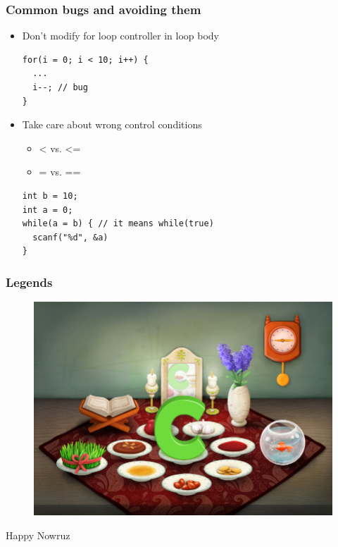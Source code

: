 \documentclass{../c-lecture}
\begin{document}
\begin{frame}[fragile]
  \frametitle{Common bugs and avoiding them}
  \begin{itemize}
    \item {\color{RubineRed} Don’t modify} for loop controller in loop body
    \begin{verbatim}
for(i = 0; i < 10; i++) {
  ...
  i--; // bug
}
    \end{verbatim}
    \item Take care about wrong control conditions
    \begin{itemize}
      \item{< vs. <=}
      \item{= vs. ==}
    \end{itemize}
    \begin{verbatim}
int b = 10;
int a = 0;
while(a = b) { // it means while(true)
  scanf("%d", &a)
}
    \end{verbatim}
  \end{itemize}
\end{frame}

\begin{frame}
  \frametitle{Legends}
  \begin{figure}
    \includegraphics[width=.75\textwidth]{./img/nowruz.jpg}
  \end{figure}
  \pause%
  \centering
  \color{Violet} Happy Nowruz
\end{frame}
\end{document}
